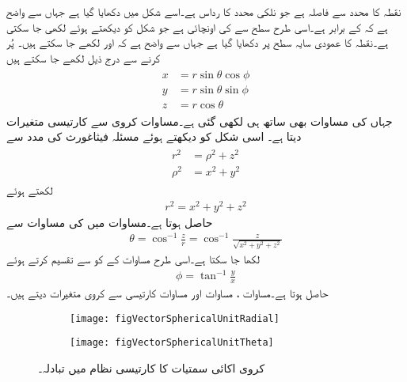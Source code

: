 نقطہ  کا  محدد سے فاصلہ   ہے جو نلکی محدد کا رداس ہے۔اسے شکل  میں دکھایا گیا ہے جہاں سے واضح ہے کہ  کے برابر ہے۔اسی طرح  سطح سے  کی اونچائی  ہے جو شکل کو دیکھتے ہوئے   لکھی جا سکتی ہے۔نقطہ  کا عمودی سایہ  سطح پر دکھایا گیا ہے جہاں سے واضح ہے کہ  اور  لکھے جا سکتے ہیں۔ پُر کرنے سے درج ذیل لکھے جا سکتے ہیں
\begin{gather}
\begin{aligned}\label{مساوات_سمتیہ_کروی_سے_کارتیسی}
x&=r \sin \theta \cos \phi\\
y&=r \sin \theta \sin \phi\\
z&=r \cos \theta
\end{aligned}
\end{gather}
جہاں  کی مساوات بھی ساتھ ہی لکھی  گئی ہے۔مساوات  کروی سے کارتیسی متغیرات دیتا ہے۔ اسی شکل کو دیکھتے ہوئے مسئلہ فیثاغورث کی مدد سے 
\begin{gather}
\begin{aligned}
r^2&=\rho^2+z^2\\
\rho^2&=x^2+y^2
\end{aligned}
\end{gather}
لکھتے ہوئے
\begin{align}\label{مساوات_سمتیہ_کروی_رداس}
r^2=x^2+y^2+z^2
\end{align}
حاصل ہوتا ہے۔مساوات  میں  کی مساوات سے
\begin{align}\label{مساوات_سمتیہ_کروی_تھیٹا}
\theta = \cos^{-1} \frac{z}{r}=\cos^{-1}\frac{z}{\sqrt{x^2+y^2+z^2}}
\end{align}
 لکھا جا سکتا ہے۔اسی طرح  مساوات  کے  کو  سے تقسیم کرتے ہوئے
\begin{align}\label{مساوات_سمتیہ_کروی_فائے}
\phi = \tan^{-1} \frac{y}{x}
\end{align}
حاصل ہوتا ہے۔مساوات ، مساوات  اور مساوات  کارتیسی سے کروی متغیرات دیتے ہیں۔
\begin{figure}
\centering
\begin{subfigure}{0.4\textwidth}
\centering
\texttt{[image: figVectorSphericalUnitRadial]}
\end{subfigure}%
%
\begin{subfigure}{0.4\textwidth}
\centering
\texttt{[image: figVectorSphericalUnitTheta]}
\end{subfigure}%
\caption{کروی اکائی سمتیات کا کارتیسی نظام میں تبادلہ۔}
\label{شکل_سمتیہ_کروی_اکائی_رداسی_سمتیہ_کارتیسی}
\end{figure}

